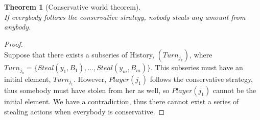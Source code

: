\documentclass[11pt]{article}
\newtheorem{theorem}{Theorem}[section]
\theoremstyle{definition}
\theoremstyle{corollary}
\theoremstyle{lemma}
\begin{document}

    \begin{theorem}[Conservative world theorem] \ \\
       \label{conservativeworld}
       If everybody follows the conservative strategy, nobody steals any amount from anybody.
    \end{theorem}
    \begin{proof} \ \\
       Suppose that there exists a subseries of History, $(Turn_{j_k})$, where $Turn_{j_k} = \{Steal(y_1,B_1),...,
       Steal(y_m,B_m)\}$. This subseries must have an initial element, $Turn_{j_1}$. However, $Player(j_1)$ follows the conservative
       strategy, thus somebody must have stolen from her as well, so $Player(j_1)$ cannot be the initial element. We have a
       contradiction, thus there cannot exist a series of stealing actions when everybody is conservative.
    \end{proof}
\end{document}
